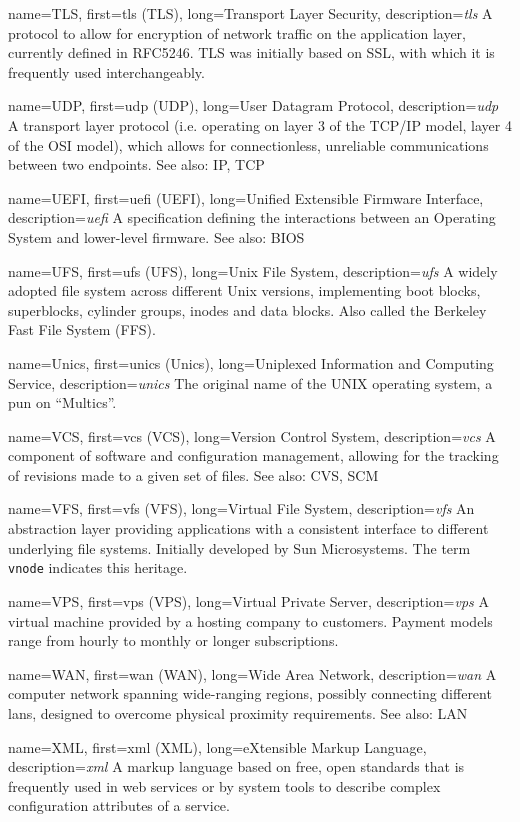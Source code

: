 {
	name={TLS},
	first={\acrlong{tls} (TLS)},
	long={Transport Layer Security},
	description={{\em \acrlong{tls}} A protocol to allow for
encryption of network traffic on the application layer, currently defined
in RFC5246.  TLS was initially based on SSL, with which it is frequently
used interchangeably.}
}

{
	name={UDP},
	first={\acrlong{udp} (UDP)},
	long={User Datagram Protocol},
	description={{\em \acrlong{udp}} A transport
layer protocol (i.e. operating on layer 3 of the
TCP/IP model, layer 4 of the OSI model), which allows
for connectionless, unreliable communications between
two endpoints.  See also: IP, TCP}
}

{
	name={UEFI},
	first={\acrlong{uefi} (UEFI)},
	long={Unified Extensible Firmware Interface},
	description={{\em \acrlong{uefi}} A specification
defining the interactions between an Operating System and lower-level
firmware.  See also: BIOS}
}

{
	name={UFS},
	first={\acrlong{ufs} (UFS)},
	long={Unix File System},
	description={{\em \acrlong{ufs}} A widely adopted file system across
different Unix versions, implementing boot blocks, superblocks, cylinder
groups, inodes and data blocks.  Also called the Berkeley Fast File System
(FFS).}
}

{
	name={Unics},
	first={\acrlong{unics} (Unics)},
	long={Uniplexed Information and Computing Service},
	description={{\em \acrlong{unics}} The
original name of the UNIX operating system, a pun on
``Multics''.}
}

{
	name={VCS},
	first={\acrlong{vcs} (VCS)},
	long={Version Control System},
	description={{\em \acrlong{vcs}} A
component of software and configuration management,
allowing for the tracking of revisions made to a given
set of files.  See also: CVS, SCM}
}

{
	name={VFS},
	first={\acrlong{vfs} (VFS)},
	long={Virtual File System},
	description={{\em \acrlong{vfs}} An abstraction layer providing
applications with a consistent interface to different underlying
file systems.  Initially developed by Sun Microsystems.  The term {\tt
vnode} indicates this heritage.}
}

{
	name={VPS},
	first={\acrlong{vps} (VPS)},
	long={Virtual Private Server},
	description={{\em \acrlong{vps}} A virtual machine provided by a
hosting company to customers.  Payment models range from hourly to monthly
or longer subscriptions.}
}

{
	name={WAN},
	first={\acrlong{wan} (WAN)},
	long={Wide Area Network},
	description={{\em \acrlong{wan}} A computer
network spanning wide-ranging regions, possibly
connecting different \acrlong{lan}s, designed to
overcome physical proximity requirements. See also: LAN}
}

{
	name={XML},
	first={\acrlong{xml} (XML)},
	long={eXtensible Markup Language},
	description={{\em \acrlong{xml}} A markup
language based on free, open standards that is frequently
used in web services or by system tools to
describe complex configuration attributes of a
service.}
}
